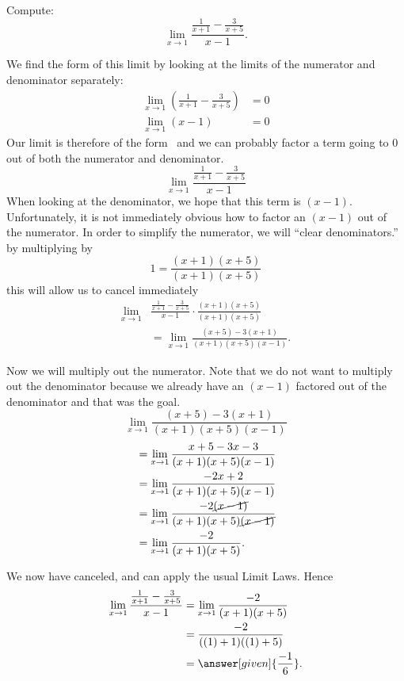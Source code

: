\documentclass{ximera}
\begin{document}
\begin{example}
  Compute:
  \[
  \lim_{x\to 1} \frac{\frac{1}{x+1}-\frac{3}{x+5}}{x-1}.
  \]
\begin{explanation}
  We find the form of this limit by looking at the limits of the
  numerator and denominator separately:
  \begin{align*}
    \lim_{x\to 1}\left(\frac{1}{x+1}-\frac{3}{x+5}\right)&=0\\
    \lim_{x\to 1}\left(x-1\right)&=0
  \end{align*}
  Our limit is therefore of the form \zeroOverZero\ and we can
  probably factor a term going to $0$ out of both the numerator and
  denominator.
  \[
  \lim_{x\to 1} \frac{\frac{1}{x+1}-\frac{3}{x+5}}{x-1}
  \]
  When looking at the denominator, we hope that this
  term is $(x-1)$.  Unfortunately, it is not immediately obvious how to
  factor an $(x-1)$ out of the numerator.  In order to simplify the
  numerator, we will ``clear denominators.'' by multiplying by
  \[
  1 = \frac{(x+1)(x+5)}{(x+1)(x+5)}
  \]
  this will allow us to cancel immediately
\begin{align*}
  \lim_{x\to 1}& \frac{\frac{1}{x+1}-\frac{3}{x+5}}{x-1}  \cdot \frac{(x+1)(x+5)}{(x+1)(x+5)} \\
  &= \lim_{x\to 1}\frac{(x+5)-3(x+1)}{(x+1)(x+5)(x-1)}.
\end{align*}

Now we will multiply out the numerator.  Note that we do not want to
multiply out the denominator because we already have an $(x-1)$
factored out of the denominator and that was the goal.
\[
\lim_{x\to 1}\frac{(x+5)-3(x+1)}{(x+1)(x+5)(x-1)}
\]
\begin{align*}
  &= \lim_{x\to 1}\frac{x+5-3x-3}{(x+1)(x+5)(x-1)} \\
  &= \lim_{x\to 1}\frac{-2x+2}{(x+1)(x+5)(x-1)}\\
  &= \lim_{x\to 1}\frac{-2\cancel{(x-1)}}{(x+1)(x+5)\cancel{(x-1)}}\\
  &= \lim_{x\to 1}\frac{-2}{(x+1)(x+5)}.
\end{align*}

We now have canceled, and can apply the usual Limit Laws.  Hence
\begin{align*}
\lim_{x\to 1} \frac{\frac{1}{x+1}-\frac{3}{x+5}}{x-1}&=\lim_{x\to
  1}\frac{-2}{(x+1)(x+5)}\\
&= \frac{-2}{((1)+1)((1)+5)} \\
&=\answer[given]{\frac{-1}{6}}.
\end{align*}
\end{explanation}
\end{example}
\end{document}
